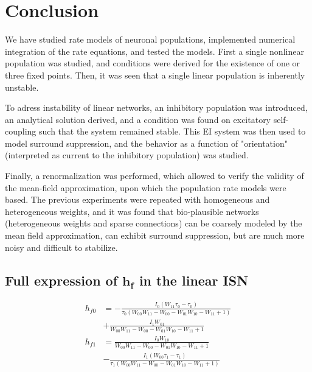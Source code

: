 \documentclass[10pt,conference,compsocconf,a4paper]{IEEEtran}
\renewcommand{\vec}[1]{\boldsymbol{#1}}
\begin{document}
\section{Conclusion}

	We have studied rate models of neuronal populations, implemented numerical integration of the rate equations, and tested the models.
	First a single nonlinear population was studied, and conditions were derived for the existence of one or three fixed points. Then, it was seen that a single linear population is inherently unstable.
	
	To adress instability of linear networks, an inhibitory population was introduced, an analytical solution derived, and a condition was found on excitatory self-coupling such that the system remained stable. This EI system was then used to model surround suppression, and the behavior as a function of "orientation" (interpreted as current to the inhibitory population) was studied.

	Finally, a renormalization was performed, which allowed to verify the validity of the mean-field approximation, upon which the population rate models were based. The previous experiments were repeated with homogeneous and heterogeneous weights, and it was found that bio-plausible networks (heterogeneous weights and sparse connections) can be coarsely modeled by the mean field approximation, can exhibit surround suppression, but are much more noisy and difficult to stabilize.



% 
% 

\newpage
\appendix

\subsection{Full expression of $\vec{h_f}$ in the linear ISN}
\label{sec:hf_full}

\begin{equation*} \label{eq:hf_full}
	\begin{aligned}
		h_{f0} &= - \frac{I_{0} \left(W_{11} \tau_{0} - \tau_{0}\right)}{\tau_{0} \left(W_{00} W_{11} - W_{00} - W_{01} W_{10} - W_{11} + 1\right)} \\ &+\frac{I_{1} W_{01}}{W_{00} W_{11} - W_{00} - W_{01} W_{10} - W_{11} + 1}\\
		h_{f1} &= \frac{I_{0} W_{10}}{W_{00} W_{11} - W_{00} - W_{01} W_{10} - W_{11} + 1} \\ &- \frac{I_{1} \left(W_{00} \tau_{1} - \tau_{1}\right)}{\tau_{1} \left(W_{00} W_{11} - W_{00} - W_{01} W_{10} - W_{11} + 1\right)}
	\end{aligned}
\end{equation*}
\end{document}

